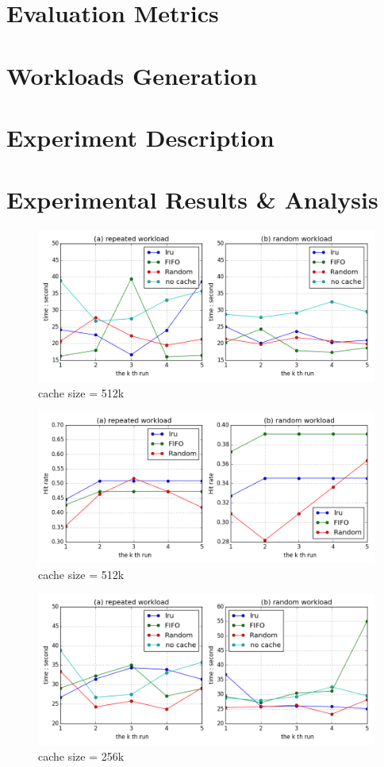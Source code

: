 \documentclass[paper=a4, fontsize=11pt]{scrartcl} %
\numberwithin{equation}{section} %
\numberwithin{figure}{section} %
\numberwithin{table}{section} %
\begin{document}
\section{Evaluation Metrics}

\section{Workloads Generation}

\section{Experiment Description}

\section{Experimental Results \& Analysis}
\begin{figure}[h]
  \centering
  \includegraphics[width=\textwidth]{../data/time512k}
  \caption{cache size = 512k}
  \label{fig:time512k}
\end{figure}
\begin{figure}[h]
  \centering
  \includegraphics[width=\textwidth]{../data/hit512k}
  \caption{cache size = 512k}
  \label{fig:hit512k}
\end{figure}
\begin{figure}[h]
  \centering
  \includegraphics[width=\textwidth]{../data/time256k}
  \caption{cache size = 256k}
  \label{fig:time256k}
\end{figure}
\end{document}
